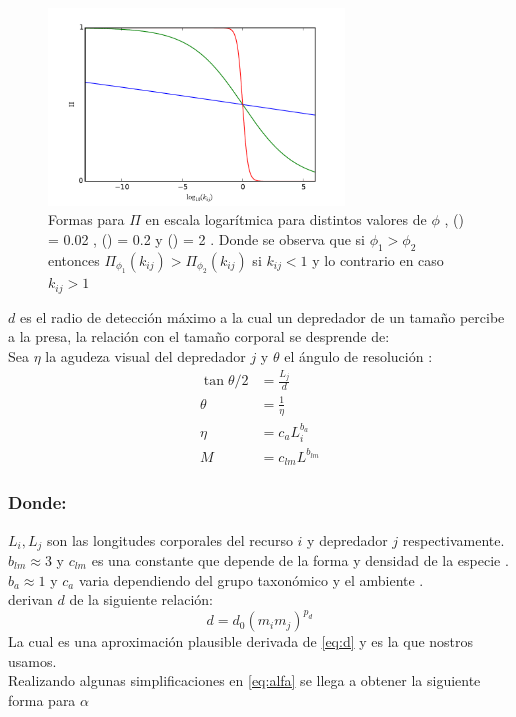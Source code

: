 \begin{figure}
\begin{center}
 \includegraphics[width=0.7\textwidth]{./Plots/CaptureEfficiency.pdf}
 \caption[$\Pi$]{ Formas para $\Pi$ en escala logar\'itmica para distintos valores de $\phi$ , ({\hwplotB}) = 0.02 , ({\hwplotG}) = 0.2 y ({\hwplotR}) = 2 . Donde se observa que si $\phi_1 > \phi_2$ entonces $\Pi_{\phi_1}(k_{ij}) >\Pi_{\phi_2}(k_{ij})$ si $k_{ij} < 1$ y lo contrario en caso $k_{ij}>1$ }
 \label{fig:efficiency} 
\end{center}
\end{figure}

$d$ es el radio de detecci\'on m\'aximo a la cual un depredador de un tama\~no percibe a la presa, la relaci\'on con el tama\~no corporal se desprende de:\\ Sea $\eta$ la agudeza visual del depredador $j$ y $\theta$ el \'angulo de resoluci\'on :
\begin{equation}\label{eq:d}
\begin{aligned}
\tan{\theta/2} &= \frac{L_{j}}{d} \\
\theta &= \frac{1}{\eta} \\
\eta & = c_a L_i^{b_a} \\
M &= c_{lm}L^{b_{lm}} 
\end{aligned}
\end{equation}
\subsubsection*{Donde:}
$L_i , L_j$ son las longitudes corporales del recurso $i$ y depredador $j$ respectivamente. \\
$b_{lm} \approx 3 $ y $c_{lm}$ es una constante que depende de la forma y densidad de la especie \citep{peters1986ecological,mcgill2006allometric}. \\
$b_a \approx 1 $ y $c_a$ varia dependiendo del grupo taxon\'omico y el ambiente \citep{kiltie2000scaling} .\\
\cite{pawar2012dimensionality} derivan $d$ de la siguiente relaci\'on:
\[ d = d_0(m_im_j)^{p_d} \]
La cual es una aproximaci\'on plausible derivada de \eqref{eq:d} y es la que nostros usamos.\\
Realizando algunas simplificaciones en \eqref{eq:alfa} se llega a obtener la siguiente forma para $\alpha$ 

